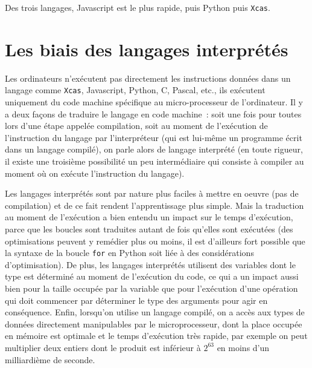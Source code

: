 \documentclass[12pt,a4paper]{book}
\begin{document}
\begin{giacjshere}
Des trois langages, Javascript est le plus rapide,
puis Python puis {\tt Xcas}.

\chapter{Les biais des langages interpr\'et\'es}

Les ordinateurs n'ex\'ecutent pas directement les instructions
donn\'ees dans un langage comme {\tt Xcas}, Javascript, Python, C, Pascal, etc.,
ils ex\'ecutent uniquement du code machine sp\'ecifique au micro-processeur
de l'ordinateur. Il y a deux fa\c{c}ons de traduire le langage en
code machine~: soit une fois pour toutes lors d'une \'etape
appel\'ee compilation, soit au moment de l'ex\'ecution de l'instruction
du langage par l'interpr\'eteur (qui est lui-m\^eme un 
programme \'ecrit dans un langage compil\'e), on parle alors de langage 
interpr\'et\'e (en toute rigueur, il existe une
troisi\`eme possibilit\'e un peu interm\'ediaire qui consiste \`a compiler
au moment o\`u on ex\'ecute l'instruction du langage).

Les langages interpr\'et\'es sont par nature plus faciles \`a 
mettre en oeuvre (pas de compilation) et de ce fait
rendent l'apprentissage plus simple. Mais la traduction au moment
de l'ex\'ecution a bien entendu un impact sur le temps d'ex\'ecution,
parce que les boucles sont traduites autant de fois
qu'elles sont ex\'ecut\'ees (des optimisations peuvent
y rem\'edier plus ou moins, il est d'ailleurs fort possible
que la syntaxe de la boucle \verb|for| en Python soit li\'ee
\`a des consid\'erations d'optimisation).
De plus, les langages interpr\'et\'es
utilisent des variables dont le type est d\'etermin\'e
au moment de l'ex\'ecution du code, ce qui a un impact aussi
bien pour la taille occup\'ee par la variable que pour l'ex\'ecution
d'une op\'eration qui doit commencer par d\'eterminer le type des
arguments pour agir en cons\'equence. Enfin,
lorsqu'on utilise un langage compil\'e, on a acc\`es
aux types de donn\'ees directement manipulables par le 
microprocesseur, dont la place occup\'ee en m\'emoire est optimale 
et le temps d'ex\'ecution tr\`es rapide,
par exemple on peut multiplier deux entiers dont le produit est
inf\'erieur \`a $2^{63}$ en moins d'un milliardi\`eme de seconde.


\end{giacjshere}
\end{document}

